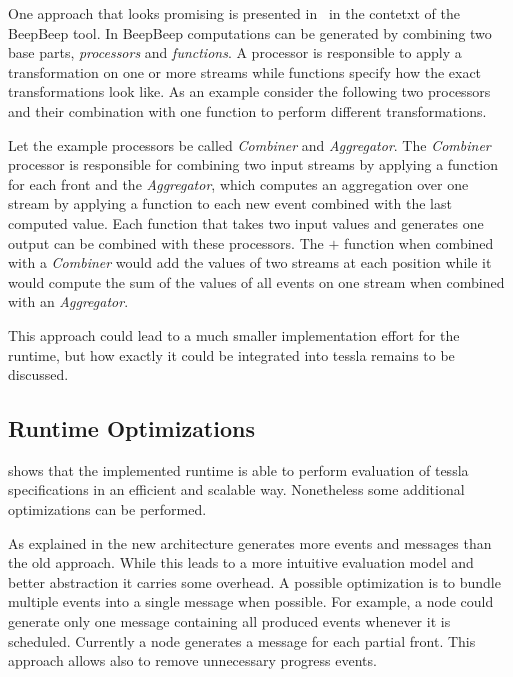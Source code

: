 One approach that looks promising is presented in~\cite{Hall2011} in the contetxt of the BeepBeep tool.
In BeepBeep computations can be generated by combining two base parts, \emph{processors} and \emph{functions}.
A processor is responsible to apply a transformation on one or more streams while functions specify how the exact transformations look like.
As an example consider the following two processors and their combination with one function to perform different transformations.

Let the example processors be called \emph{Combiner} and \emph{Aggregator}.
The \emph{Combiner} processor is responsible for combining two input streams by applying a function for each front and the \emph{Aggregator}, which computes an aggregation over one stream by applying a function to each new event combined with the last computed value.
Each function that takes two input values and generates one output can be combined with these processors.
The \(+\) function when combined with a \emph{Combiner} would add the values of two streams at each position while it would compute the sum of the values of all events on one stream when combined with an \emph{Aggregator}.

This approach could lead to a much smaller implementation effort for the runtime, but how exactly it could be integrated into \gls{tessla} remains to be discussed.

\subsection{Runtime Optimizations}
\label{sec:conclusion:further_work:runtime_optimizations}

 shows that the implemented runtime is able to perform evaluation of \gls{tessla} specifications in an efficient and scalable way.
Nonetheless some additional optimizations can be performed.

As explained in  the new architecture generates more events and messages than the old approach.
While this leads to a more intuitive evaluation model and better abstraction it carries some overhead.
A possible optimization is to bundle multiple events into a single message when possible.
For example, a node could generate only one message containing all produced events whenever it is scheduled.
Currently a node generates a message for each partial front.
This approach allows also to remove unnecessary progress events.

